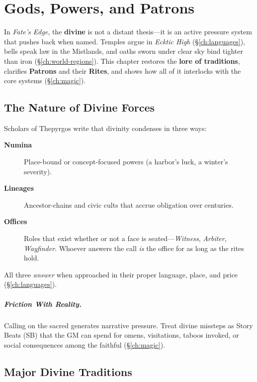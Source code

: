 \chapter{Gods, Powers, and Patrons}
\label{ch:gods-powers-patrons}

In \textit{Fate's Edge}, the \textbf{divine} is not a distant thesis—it is an active pressure system that pushes back when named. Temples argue in \emph{Ecktic High} (\S\ref{ch:languages}), bells speak law in the Mistlands, and oaths sworn under clear sky bind tighter than iron (\S\ref{ch:world-regions}). This chapter restores the \textbf{lore of traditions}, clarifies \textbf{Patrons} and their \textbf{Rites}, and shows how all of it interlocks with the core systems (\S\ref{ch:magic}).

\section{The Nature of Divine Forces}
Scholars of Thepyrgos write that divinity condenses in three ways:
\begin{description}
  \item[\textbf{Numina}]  Place-bound or concept-focused powers (a harbor's luck, a winter's severity).
  \item[\textbf{Lineages}]  Ancestor-chains and civic cults that accrue obligation over centuries.
  \item[\textbf{Offices}]  Roles that exist whether or not a face is seated—\emph{Witness}, \emph{Arbiter}, \emph{Wayfinder}. Whoever answers the call \emph{is} the office for as long as the rites hold.
\end{description}
All three \emph{answer} when approached in their proper language, place, and price (\S\ref{ch:languages}).

\paragraph{Friction With Reality.}
Calling on the sacred generates narrative pressure. Treat divine missteps as Story Beats (SB) that the GM can spend for omens, visitations, taboos invoked, or social consequences among the faithful (\S\ref{ch:magic}).

\section{Major Divine Traditions}

